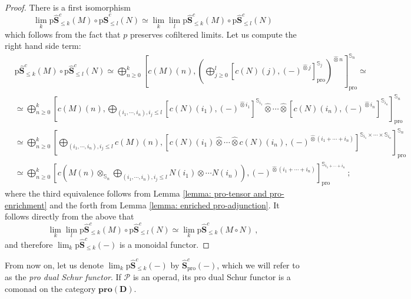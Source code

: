 \documentclass{proc-l}
\theoremstyle{plain}
\theoremstyle{definition}
\theoremstyle{remark}
\begin{document}
\begin{proof}
There is a first isomorphism
\[
\lim_k \mathrm{p}\widehat{\mathbf{S}}^c_{\leq k}(M) \circ \mathrm{p}\widehat{\mathbf{S}}^c_{\leq l}(N) \simeq \lim_k \lim_l \mathrm{p}\widehat{\mathbf{S}}^c_{\leq k}(M) \circ \mathrm{p}\widehat{\mathbf{S}}^c_{\leq l}(N)
\]
which follows from the fact that $p$ preserves cofiltered limits. Let us compute the right hand side term:
\begin{align*}
&\mathrm{p}\widehat{\mathbf{S}}^c_{\leq k}(M) \circ \mathrm{p}\widehat{\mathbf{S}}^c_{\leq l}(N) \simeq \bigoplus_{n \geq 0}^{k} \left[c(M)(n),\left(\bigoplus_{j \geq 0}^{l} \left[c(N)(j),(-)^{\widehat{\otimes} j} \right]^{\mathbb{S}_j}_{\mathrm{pro}} \right)^{\widehat{\otimes} n} \right]^{\mathbb{S}_n}_{\mathrm{pro}} \simeq \\
&\simeq \bigoplus_{n \geq 0}^{k} \left[c(M)(n),\bigoplus_{(i_1,\cdots,i_n), i_j \leq l} \left[c(N)(i_1),(-)^{\widehat{\otimes} i_1} \right]^{\mathbb{S}_{i_1}} \widehat{\otimes} \cdots \widehat{\otimes} \left[c(N)(i_n),(-)^{\widehat{\otimes} i_n} \right]^{\mathbb{S}_{i_n}} \right]^{\mathbb{S}_n}_{\mathrm{pro}} \\
&\simeq \bigoplus_{n \geq 0}^{k} \left[\bigoplus_{(i_1,\cdots,i_n), i_j \leq l} c(M)(n), \left[c(N)(i_1)\widehat{\otimes} \cdots \widehat{\otimes} c(N)(i_n),(-)^{\widehat{\otimes} (i_1 + \cdots + i_n)} \right]^{\mathbb{S}_{i_1} \times \cdots \times \mathbb{S}_{i_n}} \right]^{\mathbb{S}_n}_{\mathrm{pro}} \\
&\simeq \bigoplus_{n \geq 0}^{k} \left[c\left(M(n) \otimes_{\mathbb{S}_n} \bigoplus_{(i_1,\cdots,i_n), i_j \leq l} N(i_1) \otimes \cdots N(i_n)\right), (-)^{\widehat{\otimes} (i_1 + \cdots + i_n)} \right]^{\mathbb{S}_{i_1 + \cdots + i_n}}_{\mathrm{pro}}~;
\end{align*}
where the third equivalence follows from Lemma \ref{lemma: pro-tensor and pro-enrichment} and the forth from Lemma \ref{lemma: enriched pro-adjunction}. It follows directly from the above that
\[
\lim_k \lim_l \mathrm{p}\widehat{\mathbf{S}}^c_{\leq k}(M) \circ \mathrm{p}\widehat{\mathbf{S}}^c_{\leq l}(N) \simeq \lim_k \mathrm{p}\widehat{\mathbf{S}}^c_{\leq k}(M \circ N)~,
\]
and therefore $\lim_k \mathrm{p}\widehat{\mathbf{S}}^c_{\leq k}(-)$ is a monoidal functor.
\end{proof}

From now on, let us denote $\lim_k \mathrm{p}\widehat{\mathbf{S}}^c_{\leq k}(-)$ by $\widehat{\mathbf{S}}^c_{\mathrm{pro}}(-)$, which we will refer to as the \textit{pro dual Schur functor}. If $\mathscr{P}$ is an operad, its pro dual Schur functor is a comonad on the category $\mathbf{pro}(\mathbf{D})$.
\end{document}
